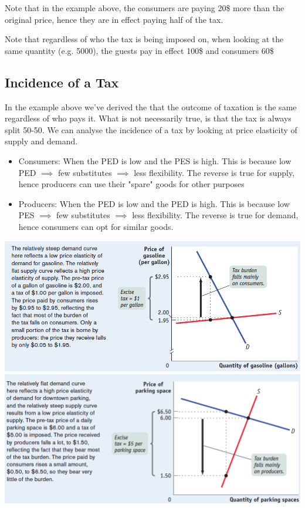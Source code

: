 \documentclass[english,course,draft]{Notes}
\begin{document}
\par{Note that in the example above, the consumers are paying 20\$ more than the original price, hence they are in effect paying half of the tax.}


\par{Note that regardless of who the tax is being imposed on, when looking at the same quantity (e.g. 5000), the guests pay in effect 100\$ and consumers 60\$}

\subsection{Incidence of a Tax}

\par{In the example above we've derived the  that the outcome of taxation is the same regardless of who pays it. What is not necessarily true, is that the tax is always split 50-50. We can analyse the incidence of a tax by looking at price elasticity of supply and demand.}

\begin{itemize}
	\item[] Consumers: When the PED is low and the PES is high. This is because low PED $\implies$ few substitutes $\implies$ less flexibility. The reverse is true for supply, hence producers can use their "spare" goods for other purposes
	\item[] Producers: When the PED is low and the PED is high. This is because low PES $\implies$ few substitutes $\implies$ less flexibility. The reverse is true for demand, hence consumers can opt for similar goods.
\end{itemize}

\includegraphics[width=\textwidth]{tax2} 
\includegraphics[width=\textwidth]{tax3} 
\end{document}
